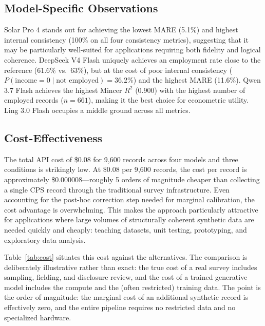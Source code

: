\documentclass[11pt]{article}
\begin{document}
\subsection{Model-Specific Observations}

Solar Pro 4 stands out for achieving the lowest MARE (5.1\%) and highest internal consistency (100\% on all four consistency metrics), suggesting that it may be particularly well-suited for applications requiring both fidelity and logical coherence.
DeepSeek V4 Flash uniquely achieves an employment rate close to the reference (61.6\% vs.\ 63\%), but at the cost of poor internal consistency ($P(\text{income}=0 \mid \text{not employed}) = 36.2\%$) and the highest MARE (11.6\%).
Qwen 3.7 Flash achieves the highest Mincer $R^2$ (0.900) with the highest number of employed records ($n=661$), making it the best choice for econometric utility.
Ling 3.0 Flash occupies a middle ground across all metrics.

\subsection{Cost-Effectiveness}

The total API cost of \$0.08 for 9{,}600 records across four models and three conditions is strikingly low.
At \$0.08 per 9{,}600 records, the cost per record is approximately \$0.000008---roughly 5 orders of magnitude cheaper than collecting a single CPS record through the traditional survey infrastructure.
Even accounting for the post-hoc correction step needed for marginal calibration, the cost advantage is overwhelming.
This makes the approach particularly attractive for applications where large volumes of structurally coherent synthetic data are needed quickly and cheaply: teaching datasets, unit testing, prototyping, and exploratory data analysis.

Table~\ref{tab:cost} situates this cost against the alternatives.
The comparison is deliberately illustrative rather than exact: the true cost of a real survey includes sampling, fielding, and disclosure review, and the cost of a trained generative model includes the compute and the (often restricted) training data.
The point is the order of magnitude: the marginal cost of an additional synthetic record is effectively zero, and the entire pipeline requires no restricted data and no specialized hardware.
\end{document}
